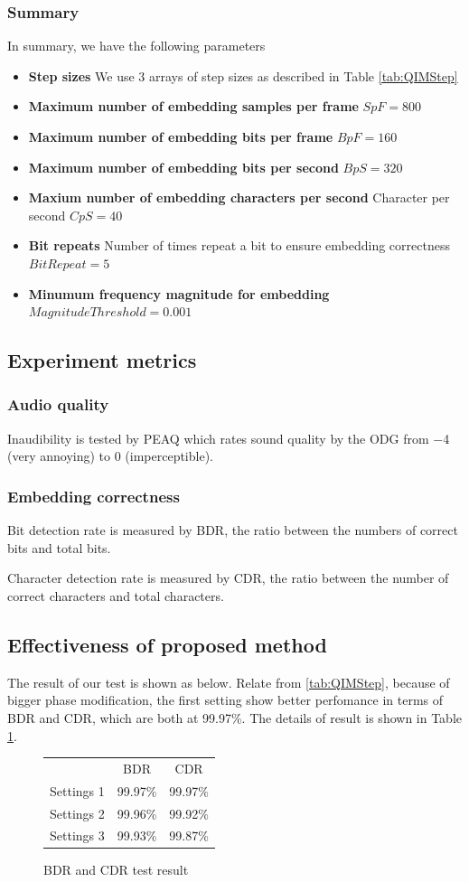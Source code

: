 \subsubsection{Summary}
In summary, we have the following parameters
\begin{itemize}
\item{\textbf{Step sizes}} We use 3 arrays of step sizes as described in Table \ref{tab:QIMStep}
\item{\textbf{Maximum number of embedding samples per frame}} \(SpF=800\)
\item{\textbf{Maximum number of embedding bits per frame}} \(BpF=160\)
\item{\textbf{Maximum number of embedding bits per second}} \(BpS=320\)
\item{\textbf{Maxium number of embedding characters per second}} Character per second \(CpS=40\)
\item{\textbf{Bit repeats}} Number of times repeat a bit to ensure embedding correctness \(BitRepeat=5\)
\item{\textbf{Minumum frequency magnitude for embedding}} \(MagnitudeThreshold=0.001\)
\end{itemize}
\subsection{Experiment metrics}
\subsubsection*{Audio quality}
Inaudibility is tested by PEAQ which rates sound quality by the ODG from −4 (very annoying) to 0 (imperceptible).
\subsubsection*{Embedding correctness}
Bit detection rate is measured by BDR, the ratio between the numbers of correct bits and total bits.

Character detection rate is measured by CDR, the ratio between the number of correct characters and total characters.
\subsection{Effectiveness of proposed method}
The result of our test is shown as below. Relate from \ref{tab:QIMStep}, because of bigger phase modification, the first setting show better perfomance in terms of BDR and CDR, which are both at 99.97\%. The details of result is shown in Table \ref{tab:bdrcdr}.
\begin{figure}
\begin{center}
\begin{tabular}{ |c|c|c| } 
 \hline
  			& BDR & CDR \\ 
 Settings 1 &  99.97\% & 99.97\% \\ 
 Settings 2 &  99.96\% & 99.92\% \\ 
 Settings 3 &  99.93\% & 99.87\% \\ 
 \hline
\end{tabular}
\end{center}
\caption{BDR and CDR test result}
\label{tab:bdrcdr}
\end{figure}

